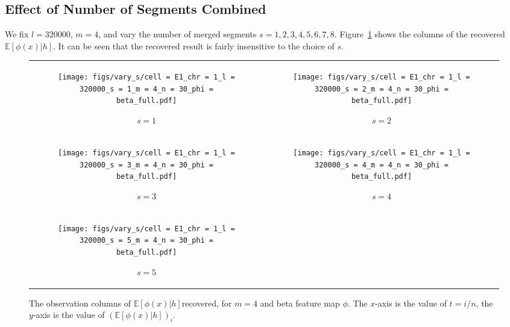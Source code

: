 \documentclass{article}
\def\E{\mathbb{E}}
\begin{document}
\subsection{Effect of Number of Segments Combined}
We fix $l = 320000$, $m = 4$, and vary the number of merged segments $s = 1,2,3,4,5,6,7,8$. Figure~\ref{fig:varys} shows the columns of the recovered $\E[\phi(x)|h]$. It can be seen that the recovered result is fairly insensitive to the choice of $s$.

\begin{figure}[H]
    \begin{tabular}{cc}
    \begin{subfigure}[t]{0.45\textwidth}
        \texttt{[image: figs/vary\_s/cell = E1\_chr = 1\_l = 320000\_s = 1\_m = 4\_n = 30\_phi = beta\_full.pdf]}
        \caption{$s = 1$}
    \end{subfigure}
    &
    \begin{subfigure}[t]{0.45\textwidth}
        \texttt{[image: figs/vary\_s/cell = E1\_chr = 1\_l = 320000\_s = 2\_m = 4\_n = 30\_phi = beta\_full.pdf]}
        \caption{$s = 2$}
    \end{subfigure}
    \\
    \begin{subfigure}[t]{0.45\textwidth}
        \texttt{[image: figs/vary\_s/cell = E1\_chr = 1\_l = 320000\_s = 3\_m = 4\_n = 30\_phi = beta\_full.pdf]}
        \caption{$s = 3$}
    \end{subfigure}
    &
    \begin{subfigure}[t]{0.45\textwidth}
        \texttt{[image: figs/vary\_s/cell = E1\_chr = 1\_l = 320000\_s = 4\_m = 4\_n = 30\_phi = beta\_full.pdf]}
        \caption{$s = 4$}
    \end{subfigure}
    \\
    \begin{subfigure}[t]{0.45\textwidth}
        \texttt{[image: figs/vary\_s/cell = E1\_chr = 1\_l = 320000\_s = 5\_m = 4\_n = 30\_phi = beta\_full.pdf]}
        \caption{$s = 5$}
    \end{subfigure}
    \end{tabular}

    \caption{The observation columns of $\E[\phi(x)|h]$recovered, for $m = 4$ and beta feature map $\phi$. The $x$-axis is the value of $t = i/n$, the $y$-axis is the value of $(\E[\phi(x)|h])_i$.}
    \label{fig:varys}
\end{figure}
\end{document}
